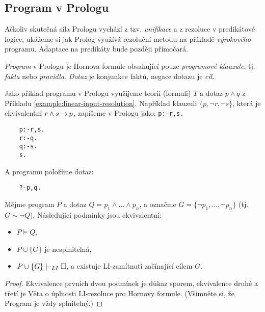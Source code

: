 
\subsection{Program v Prologu}

Ačkoliv skutečná síla Prologu vychází z tzv. \emph{unifikace} a z rezoluce v predikátové logice, ukážeme si jak Prolog využívá rezoluční metodu na příkladě \emph{výrokového} programu. Adaptace na predikáty bude později přímočará.

\emph{Program} v Prologu je Hornova formule obsahující pouze \emph{programové klauzule}, tj. \emph{fakta} nebo \emph{pravidla}. \emph{Dotaz} je konjunkce faktů, negace dotazu je \emph{cíl}.

\begin{example}
Jako příklad programu v Prologu využijeme teorii (formuli) $T$ a dotaz $p\land q$ z Příkladu \ref{example:linear-input-resolution}. Například klauzuli $\{p,\neg r,\neg s\}$, která je ekvivalentní $r\land s\mathbin{\rightarrow} p$, zapíšeme v Prologu jako: \texttt{p:-r,s.}
\begin{verbatim}
    p:-r,s.
    r:-q.
    q:-s.
    s.    
\end{verbatim}
A programu položíme dotaz:
\begin{verbatim}
    ?-p,q.    
\end{verbatim}
\end{example}

\begin{corollary}\label{corollary:propositional-prolog}
    Mějme program $P$ a dotaz $Q=p_1\land\dots\land p_n$, a označme $G=\{\neg p_1,\dots,\neg p_n\}$ (tj. $G\sim \neg Q$). Následující podmínky jsou ekvivalentní:
    \begin{itemize}
        \item $P\models Q$,
        \item $P\cup\{G\}$ je nesplnitelná,
        \item $P\cup\{G\}\proves_{LI}\square$, a existuje LI-zamítnutí začínající cílem $G$.
    \end{itemize}
\end{corollary}
\begin{proof}
    Ekvivalence prvních dvou podmínek je důkaz sporem, ekvivalence druhé a třetí je Věta o úplnosti LI-rezoluce pro Hornovy formule. (Všimněte si, že Program je vždy splnitelný.)
\end{proof}
